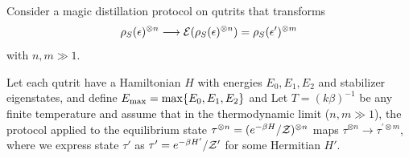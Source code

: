 \documentclass[pra,
aps,
twocolumn,
superscriptaddress,
groupedaddress,
nofootinbib,
reprint
]{revtex4-1}
\begin{document}
\begin{theorem}\label{thm:no-processing}
	Consider a magic distillation protocol on qutrits that transforms
\begin{equation*}
	\rho_S(\epsilon)^{\otimes n} \longrightarrow {\mathcal E}(\rho_S(\epsilon)^{\otimes n})=\rho_S(\epsilon')^{\otimes m} 
\end{equation*}
with $n, m \gg 1$.

Let each qutrit have a Hamiltonian $H$ with energies $E_0, E_1, E_2$ and stabilizer eigenstates, and define $E_{\rm max} = \max\{E_0, E_1, E_2\}$ and 
Let $T =(k\beta)^{-1}$ be any finite temperature and assume that in the thermodynamic limit ($n,m \gg 1$), the protocol applied to the equilibrium state $\tau^{\otimes n} = (e^{-\beta H}/\mathcal{Z})^{\otimes n}$ maps $\tau^{\otimes n} \longrightarrow \tau^{\prime \otimes m}$, where we express state $\tau'$ as $\tau' = e^{-\beta H'}/\mathcal{Z}'$ for some Hermitian $H'$.


\end{theorem}
\end{document}
